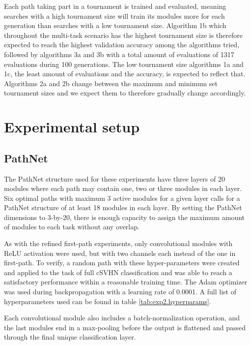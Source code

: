 Each path taking part in a tournament is trained and evaluated, meaning searches with a high tournament size will train its modules more for each generation than searches with a low tournament size. Algorithm 1b which throughout the multi-task scenario has the highest tournament size is therefore expected to reach the highest validation accuracy among the algorithms tried, followed by algorithms 3a and 3b with a total amount of evaluations of 1317 evaluations during 100 generations. The low tournament size algorithms 1a and 1c, the least amount of evaluations and the accuracy, is expected to reflect that. Algorithms 2a and 2b change between the maximum and minimum set tournament sizes and we expect them to therefore gradually change accordingly.

\section{Experimental setup}
\label{exp2:implementation}

\subsection{PathNet}
The PathNet structure used for these experiments have three layers of 20 modules where each path may contain one, two or three modules in each layer. Six optimal paths with maximum 3 active modules for a given layer calls for a PathNet structure of at least 18 modules in each layer. By setting the PathNet dimensions to 3-by-20, there is enough capacity to assign the maximum amount of modules to each task without any overlap.



As with the refined first-path experiments, only convolutional modules with ReLU activation were used, but with two channels each instead of the one in first-path. To verify, a random path with these hyper-parameters were created and applied to the task of full cSVHN classification and was able to reach a satisfactory performance within a reasonable training time. The Adam optimizer was used during backpropagation with a learning rate of 0.0001. A full list of hyperparameters used can be found in table \ref{tab:exp2.hyperparams}. 

Each convolutional module also includes a batch-normalization operation, and the last modules end in a max-pooling before the output is flattened and passed through the final unique classification layer. 

